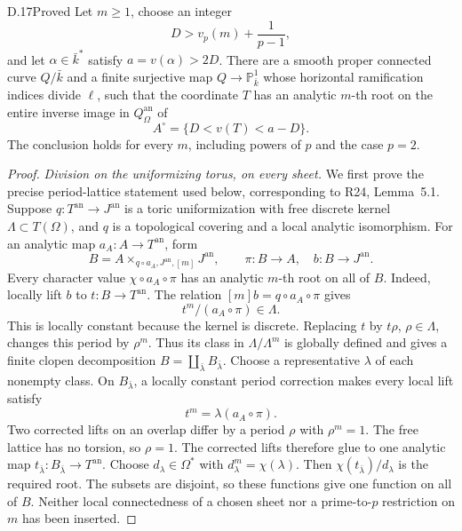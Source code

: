 \begin{claim}{D.17}{Proved}\label{clm:D17}
Let $m\ge1$, choose an integer
\[
 D>v_p(m)+\frac1{p-1},
\]
and let $\alpha\in\bar k^*$ satisfy $a=v(\alpha)>2D$.
There are a smooth proper connected curve $Q/\bar k$ and a
finite surjective map $Q\to\mathbb P^1_{\bar k}$ whose
horizontal ramification indices divide $\ell$, such that the
coordinate $T$ has an analytic $m$-th root on the entire inverse
image in $Q_\Omega^{\mathrm{an}}$ of
\[
                   A^\circ=\{D<v(T)<a-D\}.
\]
The conclusion holds for every $m$, including powers of $p$
and the case $p=2$.
\end{claim}
\begin{proof}
\emph{Division on the uniformizing torus, on every sheet.}
We first prove the precise period-lattice statement used below,
corresponding to R24, Lemma~5.1.
Suppose $q:T^{\mathrm{an}}\to J^{\mathrm{an}}$ is a toric
uniformization with free discrete kernel $\Lambda\subset T(\Omega)$,
and $q$ is a topological covering and a local analytic isomorphism.
For an analytic map $a_A:A\to T^{\mathrm{an}}$, form
\[
 B=A\times_{q\circ a_A,J^{\mathrm{an}},[m]}J^{\mathrm{an}},
       \qquad \pi:B\to A,\quad b:B\to J^{\mathrm{an}}.
\]
Every character value $\chi\circ a_A\circ\pi$ has an analytic
$m$-th root on all of $B$.
Indeed, locally lift $b$ to $t:B\to T^{\mathrm{an}}$.
The relation $[m]b=q\circ a_A\circ\pi$ gives
\[
                  t^m/(a_A\circ\pi)\in\Lambda.
\]
This is locally constant because the kernel is discrete.
Replacing $t$ by $t\rho$, $\rho\in\Lambda$, changes this
period by $\rho^m$. Thus its class in $\Lambda/\Lambda^m$
is globally defined and gives a finite clopen decomposition
$B=\coprod_{\bar\lambda}B_{\bar\lambda}$.
Choose a representative $\lambda$ of each nonempty class.
On $B_{\bar\lambda}$, a locally constant period correction
makes every local lift satisfy
\[
                         t^m=\lambda(a_A\circ\pi).
\]
Two corrected lifts on an overlap differ by a period $\rho$
with $\rho^m=1$. The free lattice has no torsion, so $\rho=1$.
The corrected lifts therefore glue to one analytic map
$t_{\bar\lambda}:B_{\bar\lambda}\to T^{\mathrm{an}}$.
Choose $d_\lambda\in\Omega^*$ with
$d_\lambda^m=\chi(\lambda)$. Then
$\chi(t_{\bar\lambda})/d_\lambda$ is the required root.
The subsets are disjoint, so these functions give one function
on all of $B$. Neither local connectedness of a chosen sheet
nor a prime-to-$p$ restriction on $m$ has been inserted.


\end{proof}
